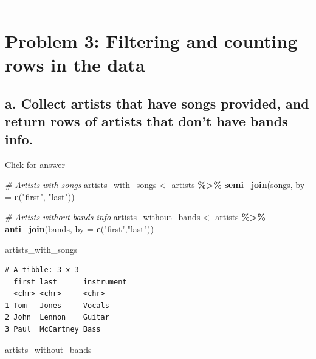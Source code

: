 \documentclass[
]{book}
\newenvironment{Shaded}{\begin{snugshade}}{\end{snugshade}}
\newcommand{\AttributeTok}[1]{\textcolor[rgb]{0.13,0.29,0.53}{#1}}
\newcommand{\CommentTok}[1]{\textcolor[rgb]{0.56,0.35,0.01}{\textit{#1}}}
\newcommand{\FunctionTok}[1]{\textcolor[rgb]{0.13,0.29,0.53}{\textbf{#1}}}
\newcommand{\NormalTok}[1]{#1}
\newcommand{\OtherTok}[1]{\textcolor[rgb]{0.56,0.35,0.01}{#1}}
\newcommand{\SpecialCharTok}[1]{\textcolor[rgb]{0.81,0.36,0.00}{\textbf{#1}}}
\newcommand{\StringTok}[1]{\textcolor[rgb]{0.31,0.60,0.02}{#1}}
\begin{document}
\begin{center}\rule{0.5\linewidth}{0.5pt}\end{center}

\hypertarget{problem-3-filtering-and-counting-rows-in-the-data}{%
\section{Problem 3: Filtering and counting rows in the data}\label{problem-3-filtering-and-counting-rows-in-the-data}}

\hypertarget{a.-collect-artists-that-have-songs-provided-and-return-rows-of-artists-that-dont-have-bands-info.}{%
\subsection{a. Collect artists that have songs provided, and return rows of artists that don't have bands info.}\label{a.-collect-artists-that-have-songs-provided-and-return-rows-of-artists-that-dont-have-bands-info.}}

Click for answer

\begin{Shaded}
\begin{Highlighting}[]
\CommentTok{\# Artists with songs}
\NormalTok{artists\_with\_songs }\OtherTok{\textless{}{-}}\NormalTok{ artists }\SpecialCharTok{\%\textgreater{}\%} 
  \FunctionTok{semi\_join}\NormalTok{(songs, }\AttributeTok{by =} \FunctionTok{c}\NormalTok{(}\StringTok{"first"}\NormalTok{, }\StringTok{"last"}\NormalTok{))}

\CommentTok{\# Artists without bands info}
\NormalTok{artists\_without\_bands }\OtherTok{\textless{}{-}}\NormalTok{ artists }\SpecialCharTok{\%\textgreater{}\%} 
  \FunctionTok{anti\_join}\NormalTok{(bands, }\AttributeTok{by =} \FunctionTok{c}\NormalTok{(}\StringTok{"first"}\NormalTok{,}\StringTok{"last"}\NormalTok{))}

\NormalTok{artists\_with\_songs}
\end{Highlighting}
\end{Shaded}

\begin{verbatim}
# A tibble: 3 x 3
  first last      instrument
  <chr> <chr>     <chr>     
1 Tom   Jones     Vocals    
2 John  Lennon    Guitar    
3 Paul  McCartney Bass      
\end{verbatim}

\begin{Shaded}
\begin{Highlighting}[]
\NormalTok{artists\_without\_bands}
\end{Highlighting}
\end{Shaded}
\end{document}
